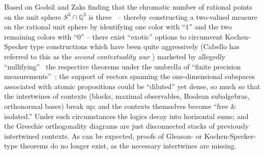 \documentclass[%
  twocolumn,
 showpacs,
 showkeys,
 preprintnumbers,
 amsmath,amssymb,
 aps,
  pra,
  longbibliography,
 floatfix,
 ]{revtex4-1}
\begin{document}
Based on Godsil and Zaks finding that the chromatic number of rational points on the  unit sphere
$S^3\cap \mathbb{Q}^3$
is three~\cite[Lemma~1.2]{godsil-zaks} -- thereby constructing a two-valued measure on the rational unit sphere
by identifying one color with ``$1$'' and the two remaining colors with ``$0$'' --
there exist ``exotic'' options to circumvent Kochen-Specker type constructions which have been quite aggressively (Cabello has referred to this
as the {\em second contextuality war} \cite{Cabello-talk-Vajo-2017})
marketed by allegedly ``nullifying''~\cite{meyer:99} the respective theorems
under the umbrella of ``finite precision measurements''~\cite{kent:99,clifton:99,mermin-99iks,Breuer-02a,Breuer-02b,Barrett-2004}:
the support of vectors spanning the one-dimensional subspaces associated with atomic propositions could be ``diluted'' yet dense,
so much so that the intertwines of contexts (blocks, maximal observables, Boolean subalgebras, orthonormal bases) break up;
and the contexts themselves become ``free \& isolated.''
Under such circumstances the logics decay into horizontal sums;
and the Greechie orthogonality diagrams are just disconnected stacks of previously intertwined contexts.
As can be expected, proofs of Gleason- or Kochen-Specker-type theorems do no longer exist,
as the necessary intertwines are missing.

\end{document}

